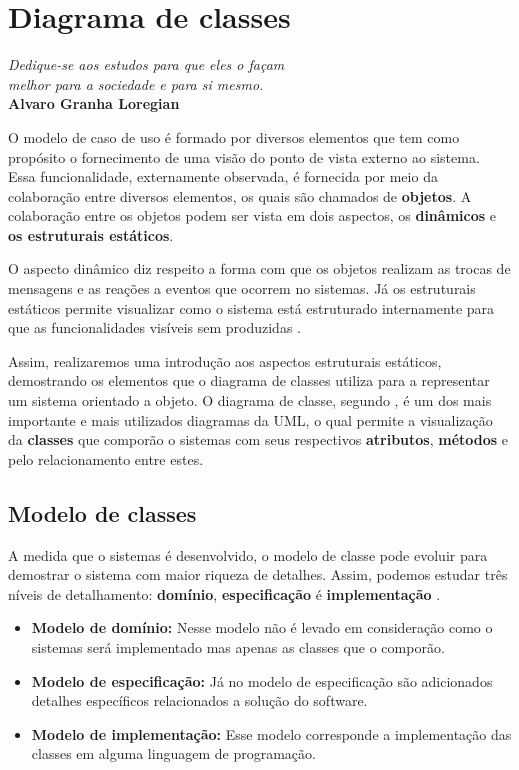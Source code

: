 \setcounter{chapter}{1}
\chapter{Diagrama de classes}

\begin{flushright}
	\textit{
		Dedique-se aos estudos para que eles o façam \\
		melhor para a sociedade e para si mesmo.
	} \\
	
	\textbf{Alvaro Granha Loregian}
\end{flushright}

O modelo de caso de uso é formado por diversos elementos que tem como propósito o fornecimento de uma visão do ponto de vista externo ao sistema. Essa funcionalidade, externamente observada, é fornecida por meio da colaboração entre diversos elementos, os quais são chamados de \textbf{objetos}. A colaboração entre os objetos podem ser vista em dois aspectos, os \textbf{dinâmicos} e \textbf{os estruturais estáticos}.

O aspecto dinâmico diz respeito a forma com que os objetos realizam as trocas de mensagens e as reações a eventos que ocorrem no sistemas. Já os estruturais estáticos permite visualizar como o sistema está estruturado internamente para que as funcionalidades visíveis sem produzidas \cite{bezerra2016principios}.

Assim, realizaremos uma introdução aos aspectos estruturais estáticos, demostrando os elementos que o diagrama de classes utiliza para a representar um sistema orientado a objeto. O diagrama de classe, segundo , é um dos mais importante e mais utilizados diagramas da UML, o qual permite a visualização da \textbf{classes} que comporão o sistemas com seus respectivos \textbf{atributos}, \textbf{métodos} e pelo relacionamento entre estes.

\section{Modelo de classes}

A medida que o sistemas é desenvolvido, o modelo de classe pode evoluir para demostrar o sistema com maior riqueza de detalhes. Assim, podemos estudar três níveis de detalhamento: \textbf{domínio}, \textbf{especificação} é \textbf{implementação} \cite{bezerra2016principios}.

\begin{itemize}
	\item \textbf{Modelo de domínio: } Nesse modelo não é levado em consideração como o sistemas será implementado mas apenas as classes que o comporão.
	\item \textbf{Modelo de especificação: } Já no modelo de especificação são adicionados detalhes específicos relacionados a solução do software.
	\item \textbf{Modelo de implementação: } Esse modelo corresponde a implementação das classes em alguma linguagem de programação. 
\end{itemize}

